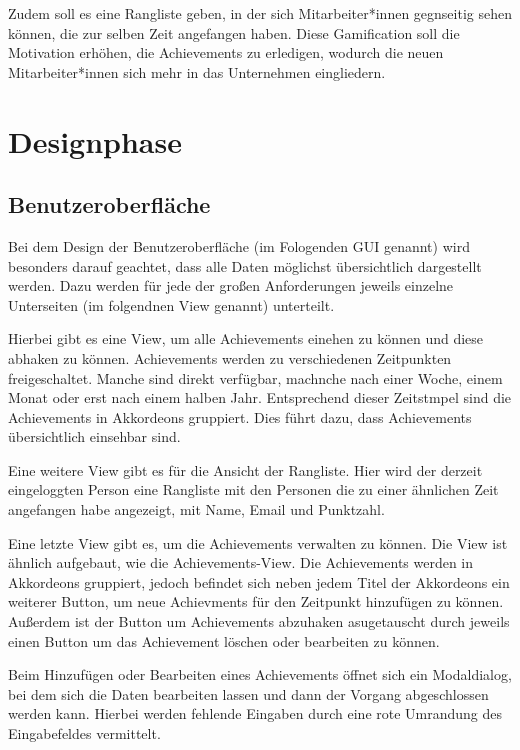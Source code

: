 \documentclass[12pt]{article}
\begin{document}
Zudem soll es eine Rangliste geben, in der sich Mitarbeiter*innen gegnseitig
sehen können, die zur selben Zeit angefangen haben. Diese Gamification soll
die Motivation erhöhen, die Achievements zu erledigen, wodurch die neuen
Mitarbeiter*innen sich mehr in das Unternehmen eingliedern.


%
%

\section{Designphase}

\subsection{Benutzeroberfläche}

Bei dem Design der Benutzeroberfläche (im Fologenden GUI genannt) wird
besonders darauf geachtet, dass alle Daten möglichst übersichtlich
dargestellt werden. Dazu werden für jede der großen Anforderungen
jeweils einzelne Unterseiten (im folgendnen View genannt) unterteilt. 

Hierbei gibt es eine View, um alle Achievements einehen zu können
und diese abhaken zu können. Achievements werden zu verschiedenen
Zeitpunkten freigeschaltet. Manche sind direkt verfügbar, machnche 
nach einer Woche, einem Monat oder erst nach einem halben Jahr. 
Entsprechend dieser Zeitstmpel sind die Achievements in Akkordeons
gruppiert. Dies führt dazu, dass Achievements übersichtlich einsehbar
sind.

Eine weitere View gibt es für die Ansicht der Rangliste. Hier wird
der derzeit eingeloggten Person eine Rangliste mit den Personen die
zu einer ähnlichen Zeit angefangen habe angezeigt, mit Name, Email 
und Punktzahl.

Eine letzte View gibt es, um die Achievements verwalten zu können.
Die View ist ähnlich aufgebaut, wie die Achievements-View. Die Achievements
werden in Akkordeons gruppiert, jedoch befindet sich neben jedem Titel
der Akkordeons ein weiterer Button, um neue Achievments für den Zeitpunkt
hinzufügen zu können. Außerdem ist der Button um Achievements abzuhaken
asugetauscht durch jeweils einen Button um das Achievement löschen oder 
bearbeiten zu können.

Beim Hinzufügen oder Bearbeiten eines Achievements öffnet sich ein
Modaldialog, bei dem sich die Daten bearbeiten lassen und dann der
Vorgang abgeschlossen werden kann. Hierbei werden fehlende Eingaben durch
eine rote Umrandung des Eingabefeldes vermittelt.
\end{document}
